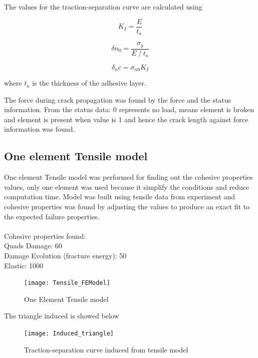 \documentclass[numbers=noendperiod,chapterprefix=on]{icldt} %
\begin{document}
{The values for the traction-separation curve are calculated using \cite{Brett2011}

\begin{equation} 
K_I  =\frac{E}{t_a}
\end{equation}

\begin{equation} 
\delta n_0=\frac{\sigma_y}{E⁄t_a}
\end{equation}

\begin{equation} 
\delta_nc=\sigma_{n0} K_I
\end{equation}

where $t_{a}$ is the thickness of the adhesive layer. 

The force during crack propagation was found by the force and the status information.
From the status data: 0 represents no load, means element is broken and element is present when value is 1 and hence the crack length against force information was found.

\subsection{One element Tensile model}
 One element Tensile model was performed for finding out the cohesive properties values, only one element was used because it simplify the conditions and reduce computation time. Model was built using tensile data from experiment and cohesive properties was found by adjusting the values to produce an exact fit to the expected failure properties. \\
 \\
 Cohesive properties found:\\
 Quads Damage: 60\\
  Damage Evolution (fracture energy): 50\\
  Elastic: 1000 
  \\
 \begin{figure}[!htpb]
  \centering
  \texttt{[image: Tensile\_FEModel]}
  \caption{One Element Tensile model}\label{Tensile_FEModel}
  \end{figure}
  \FloatBarrier

 The triangle induced is showed below
 \begin{figure}[!htpb]
 \centering
 \texttt{[image: Induced\_triangle]}
 \caption{Traction-separation curve induced from tensile model}\label{Induced_triangle}
 \end{figure}
 \FloatBarrier
 
}
\end{document}
